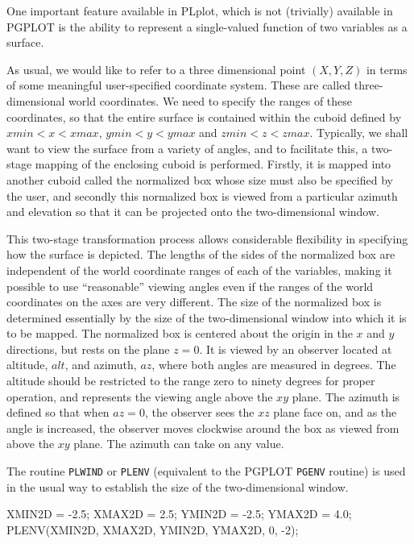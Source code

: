 \documentclass[twoside,11pt]{starlink}
\begin{document}
One important feature available in PLplot, which is not (trivially)
available in PGPLOT is the ability to represent a single-valued
function of two variables as a surface.

As usual, we would like to refer to a three dimensional point $(X, Y,
Z)$ in terms of some meaningful user-specified coordinate system.
These are called three-dimensional world coordinates. We need to
specify the ranges of these coordinates, so that the entire surface is
contained within the cuboid defined by $xmin<x<xmax$, $ymin<y<ymax$
and $zmin<z<zmax$. Typically, we shall want to view the surface from a
variety of angles, and to facilitate this, a two-stage mapping of the
enclosing cuboid is performed. Firstly, it is mapped into another
cuboid called the normalized box whose size must also be specified by
the user, and secondly this normalized box is viewed from a particular
azimuth and elevation so that it can be projected onto the
two-dimensional window.

This two-stage transformation process allows considerable flexibility
in specifying how the surface is depicted. The lengths of the sides of
the normalized box are independent of the world coordinate ranges of
each of the variables, making it possible to use ``reasonable''
viewing angles even if the ranges of the world coordinates on the axes
are very different. The size of the normalized box is determined
essentially by the size of the two-dimensional window into which it is
to be mapped. The normalized box is centered about the origin in the
$x$ and $y$ directions, but rests on the plane $z = 0$. It is viewed
by an observer located at altitude, $alt$, and azimuth, $az$, where
both angles are measured in degrees. The altitude should be restricted
to the range zero to ninety degrees for proper operation, and
represents the viewing angle above the $xy$ plane. The azimuth is
defined so that when $az = 0$, the observer sees the $xz$ plane face
on, and as the angle is increased, the observer moves clockwise around
the box as viewed from above the $xy$ plane. The azimuth can take on
any value.

The routine \texttt{PLWIND} or \texttt{PLENV} (equivalent to the PGPLOT \texttt{PGENV} routine) is used in the usual way to establish the size of the
two-dimensional window.

\begin{small}
\begin{terminalv}
XMIN2D = -2.5;
XMAX2D =  2.5;
YMIN2D = -2.5;
YMAX2D =  4.0;
PLENV(XMIN2D, XMAX2D, YMIN2D, YMAX2D, 0, -2);
\end{terminalv}
\end{small}
\end{document}
